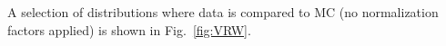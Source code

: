 
%  

A selection of distributions where data is compared to MC (no normalization factors applied) is shown in Fig.~\ref{fig:VRW}. 




